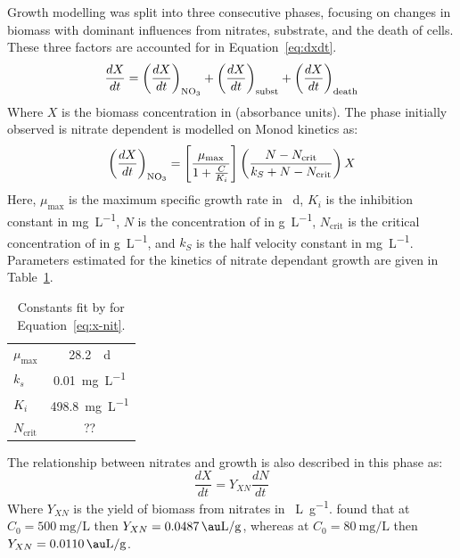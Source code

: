 Growth modelling was split into three consecutive phases, focusing on changes in biomass with dominant influences from nitrates, substrate, and the death of cells. These three factors are accounted for in Equation~\ref{eq:dxdt}.
\begin{align}
\frac{dX}{dt} = \left(\frac{dX}{dt}\right)_\textrm{\ce{NO3}} + \left(\frac{dX}{dt}\right)_\textrm{subst} + \left(\frac{dX}{dt}\right)_\textrm{death} \label{eq:dxdt}
\end{align}
Where $ X $ is the biomass concentration in \si{\au} (absorbance units). The phase initially observed is nitrate dependent is modelled on Monod kinetics as:
\begin{align}
	\left(\frac{dX}{dt}\right)_\textrm{\ce{NO3}} = \left[\frac{\mu_\textrm{max}}{1 + \frac{C}{K_i}}\right] \left( \frac{N - N_\textrm{crit}}{k_S + N - N_\textrm{crit}} \right) X \label{eq:x-nit} 
\end{align}
Here, $ \mu_\textrm{max} $ is the maximum specific growth rate in \si{\per\day},  $ K_i $ is the  inhibition constant in \si{\milli\gram\per\liter}, $ N $ is the concentration of  in \si{\gram\per\liter}, $ N_\textrm{crit} $ is the critical concentration of  in \si{\gram\per\liter}, and $ k_S $ is the half velocity constant in \si{\milli\gram\per\liter}. Parameters estimated for the kinetics of nitrate dependant growth are given in Table~\ref{tab:x-nit}.

\begin{table}[htbp!]
	\caption{Constants fit by \textcite{Horstman2019} for Equation~\ref{eq:x-nit}.}
	\label{tab:x-nit}
	\centering
	\begin{small}
	\begin{tabular}{lc}
		\toprule
		$ \mu_\textrm{max} $ & \SI{28.2}{\per\day} \\
		$ k_s $ & \SI{0.01}{\milli\gram\per\liter}  \\
		$ K_i $ & \SI{498.8}{\milli\gram\per\liter}  \\
		$ N_\textrm{crit} $ & ?? \\
		\bottomrule
	\end{tabular}
\end{small}
\end{table}

The relationship between nitrates and growth is also described in this phase as:
\begin{equation}
	\frac{dX}{dt} = Y_{XN} \frac{dN}{dt}
\end{equation}
Where $ Y_{XN} $ is the yield of biomass from nitrates in \si[inter-unit-product=\ensuremath{{}\cdot{}}]{\au\liter\per\gram}. \textcite{Horstman2019} found that at $ C_0 = \SI{500}{\milli\gram\per\liter}$ then $ Y_{XN} = \SI[inter-unit-product=\ensuremath{{}\cdot{}}]{0.0487}{\au\liter\per\gram} $, whereas at $ C_0 = \SI{80}{\milli\gram\per\liter}$ then $ Y_{XN} = \SI[inter-unit-product=\ensuremath{{}\cdot{}}]{0.0110}{\au\liter\per\gram} $.

